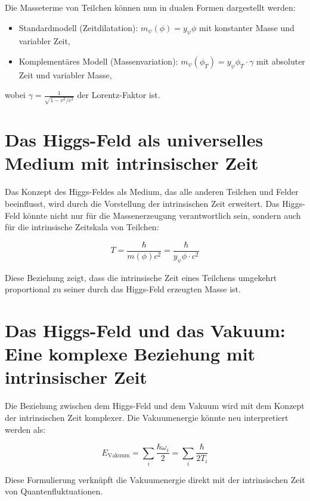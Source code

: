 \documentclass{article}
\begin{document}
	Die Masseterme von Teilchen können nun in dualen Formen dargestellt werden:
	
	\begin{itemize}
		\item Standardmodell (Zeitdilatation): $m_\psi(\phi) = y_\psi \phi$ mit konstanter Masse und variabler Zeit,
		\item Komplementäres Modell (Massenvariation): $m_\psi(\phi_T) = y_\psi \phi_T \cdot \gamma$ mit absoluter Zeit und variabler Masse,
	\end{itemize}
	
	wobei $\gamma = \frac{1}{\sqrt{1-v^2/c^2}}$ der Lorentz-Faktor ist.
	
	\section{Das Higgs-Feld als universelles Medium mit intrinsischer Zeit}
	
	Das Konzept des Higgs-Feldes als Medium, das alle anderen Teilchen und Felder beeinflusst, wird durch die Vorstellung der intrinsischen Zeit erweitert. Das Higgs-Feld könnte nicht nur für die Massenerzeugung verantwortlich sein, sondern auch für die intrinsische Zeitskala von Teilchen:
	
	\begin{equation}
		T = \frac{\hbar}{m(\phi)c^2} = \frac{\hbar}{y_\psi \phi \cdot c^2}
	\end{equation}
	
	Diese Beziehung zeigt, dass die intrinsische Zeit eines Teilchens umgekehrt proportional zu seiner durch das Higgs-Feld erzeugten Masse ist.
	
	\section{Das Higgs-Feld und das Vakuum: Eine komplexe Beziehung mit intrinsischer Zeit}
	
	Die Beziehung zwischen dem Higgs-Feld und dem Vakuum wird mit dem Konzept der intrinsischen Zeit komplexer. Die Vakuumenergie könnte neu interpretiert werden als:
	
	\begin{equation}
		E_\text{Vakuum} = \sum_i \frac{\hbar \omega_i}{2} = \sum_i \frac{\hbar}{2T_i}
	\end{equation}
	
	Diese Formulierung verknüpft die Vakuumenergie direkt mit der intrinsischen Zeit von Quantenfluktuationen.
	
\end{document}
